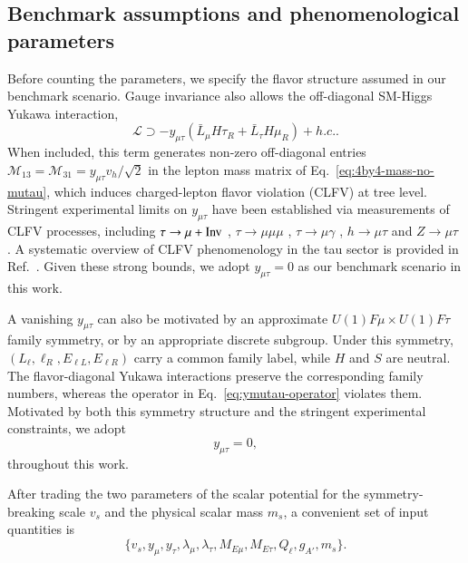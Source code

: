 \documentclass[onecolumn, aps, nofootinbib, prd, preprint, floats, floatfix, amsmath, amssymb, superscriptaddress, preprintnumbers]{revtex4-2}
\begin{document}
\subsection{Benchmark assumptions and phenomenological parameters}

Before counting the parameters, we specify the flavor structure assumed in our benchmark scenario. Gauge invariance also allows the off-diagonal SM-Higgs Yukawa interaction,
\begin{equation}
    \mathcal{L}\supset
    -y_{\mu\tau}(\bar{L}_{\mu}H \tau_R + \bar{L}_{\tau}H \mu_R)+h.c. .
\label{eq:ymutau-operator}
\end{equation}
When included, this term generates non-zero off-diagonal entries $\mathcal{M}_{13}=\mathcal{M}_{31}=y_{\mu\tau}v_h/\sqrt{2}$ in the lepton mass matrix of Eq.~\eqref{eq:4by4-mass-no-mutau}, which induces charged-lepton flavor violation (CLFV) at tree level. Stringent experimental limits on $y_{\mu\tau}$ have been established via measurements of CLFV processes, including $\tau\to\mu +{\rm Inv}$ \cite{Ibarra:2021xyk}, $\tau\to\mu \mu\mu$ \cite{Ibarra:2021xyk,Hayasaka:2010np,Belle-II:2024sce}, $\tau\to \mu\gamma$ \cite{Belle:2021ysv}, $h\to\mu\tau$ \cite{Harnik:2012pb,CMS:2021rsq} and $Z\to \mu\tau$ \cite{ATLAS:2021bdj}.
A systematic overview of CLFV phenomenology in the tau sector is provided in Ref.~\cite{Banerjee:2022xuw}. Given these strong bounds, we adopt $y_{\mu\tau}=0$ as our benchmark scenario in this work.

A vanishing $y_{\mu\tau}$ can also be motivated by an approximate
$U(1){F\mu}\times U(1){F\tau}$ family symmetry, or by an appropriate discrete subgroup. Under this symmetry,
$(L_\ell,\ell_R,E_{\ell L},E_{\ell R})$ carry a common family label, while $H$ and $S$ are neutral. The flavor-diagonal Yukawa interactions preserve the corresponding family numbers, whereas the operator in Eq.~\eqref{eq:ymutau-operator} violates them. Motivated by both this symmetry structure and the stringent experimental constraints, we adopt
\begin{equation}
y_{\mu\tau}=0,
\end{equation}
throughout this work.

After trading the two parameters of the scalar potential for the symmetry-breaking scale $v_s$ and the physical scalar mass $m_s$, a convenient set of input quantities is
\begin{equation}
    \{v_s, y_\mu, y_\tau, \lambda_\mu,\lambda_\tau, M_{E\mu}, M_{E\tau}, Q_\ell, g_{A'}, m_s \}.
\end{equation}
\end{document}

